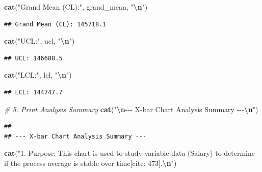 \documentclass[
]{article}
\newenvironment{Shaded}{\begin{snugshade}}{\end{snugshade}}
\newcommand{\CommentTok}[1]{\textcolor[rgb]{0.56,0.35,0.01}{\textit{#1}}}
\newcommand{\FunctionTok}[1]{\textcolor[rgb]{0.13,0.29,0.53}{\textbf{#1}}}
\newcommand{\NormalTok}[1]{#1}
\newcommand{\SpecialCharTok}[1]{\textcolor[rgb]{0.81,0.36,0.00}{\textbf{#1}}}
\newcommand{\StringTok}[1]{\textcolor[rgb]{0.31,0.60,0.02}{#1}}
\begin{document}
\begin{Shaded}
\begin{Highlighting}[]
\FunctionTok{cat}\NormalTok{(}\StringTok{"Grand Mean (CL):"}\NormalTok{, grand\_mean, }\StringTok{"}\SpecialCharTok{\textbackslash{}n}\StringTok{"}\NormalTok{)}
\end{Highlighting}
\end{Shaded}

\begin{verbatim}
## Grand Mean (CL): 145718.1
\end{verbatim}

\begin{Shaded}
\begin{Highlighting}[]
\FunctionTok{cat}\NormalTok{(}\StringTok{"UCL:"}\NormalTok{, ucl, }\StringTok{"}\SpecialCharTok{\textbackslash{}n}\StringTok{"}\NormalTok{)}
\end{Highlighting}
\end{Shaded}

\begin{verbatim}
## UCL: 146688.5
\end{verbatim}

\begin{Shaded}
\begin{Highlighting}[]
\FunctionTok{cat}\NormalTok{(}\StringTok{"LCL:"}\NormalTok{, lcl, }\StringTok{"}\SpecialCharTok{\textbackslash{}n}\StringTok{"}\NormalTok{)}
\end{Highlighting}
\end{Shaded}

\begin{verbatim}
## LCL: 144747.7
\end{verbatim}

\begin{Shaded}
\begin{Highlighting}[]
\CommentTok{\# 5. Print Analysis Summary}
\FunctionTok{cat}\NormalTok{(}\StringTok{"}\SpecialCharTok{\textbackslash{}n}\StringTok{{-}{-}{-} X{-}bar Chart Analysis Summary {-}{-}{-}}\SpecialCharTok{\textbackslash{}n}\StringTok{"}\NormalTok{)}
\end{Highlighting}
\end{Shaded}

\begin{verbatim}
## 
## --- X-bar Chart Analysis Summary ---
\end{verbatim}

\begin{Shaded}
\begin{Highlighting}[]
\FunctionTok{cat}\NormalTok{(}\StringTok{"1. Purpose: This chart is used to study variable data (Salary) to determine if the process average is stable over time[cite: 473].}\SpecialCharTok{\textbackslash{}n}\StringTok{"}\NormalTok{)}
\end{Highlighting}
\end{Shaded}
\end{document}
